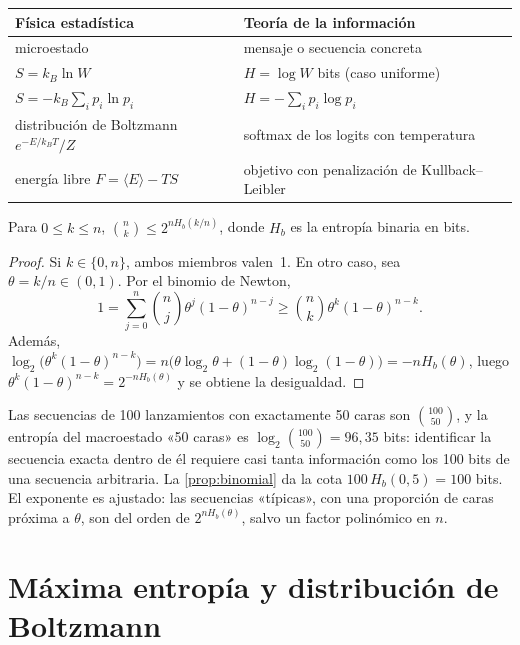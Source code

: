 \begin{center}
\begin{tabular}{@{}ll@{}}
\toprule
Física estadística & Teoría de la información \\
\midrule
microestado & mensaje o secuencia concreta \\
$S=k_B\ln W$ & $H=\log W$ bits (caso uniforme) \\
$S=-k_B\sum_ip_i\ln p_i$ & $H=-\sum_ip_i\log p_i$ \\
distribución de Boltzmann $e^{-E/k_BT}/Z$ & softmax de los logits con temperatura \\
energía libre $F=\langle E\rangle-TS$ & objetivo con penalización de Kullback--Leibler \\
\bottomrule
\end{tabular}
\end{center}

\begin{proposicion}\label{prop:binomial}
Para $0\le k\le n$, $\binom{n}{k}\le 2^{nH_b(k/n)}$, donde $H_b$ es la entropía binaria en bits.
\end{proposicion}

\begin{proof}
Si $k\in\{0,n\}$, ambos miembros valen~1. En otro caso, sea $\theta=k/n\in(0,1)$. Por el binomio de Newton,
\[
1=\sum_{j=0}^{n}\binom{n}{j}\theta^{j}(1-\theta)^{n-j}\ge\binom{n}{k}\theta^{k}(1-\theta)^{n-k}.
\]
Además, $\log_2\bigl(\theta^{k}(1-\theta)^{n-k}\bigr)=n\bigl(\theta\log_2\theta+(1-\theta)\log_2(1-\theta)\bigr)=-nH_b(\theta)$, luego $\theta^{k}(1-\theta)^{n-k}=2^{-nH_b(\theta)}$ y se obtiene la desigualdad.
\end{proof}

\begin{ejemplo}\label{ej:monedas}
Las secuencias de 100 lanzamientos con exactamente 50 caras son $\binom{100}{50}$, y la entropía del macroestado «50 caras» es $\log_2\binom{100}{50}=96{,}35$ bits: identificar la secuencia exacta dentro de él requiere casi tanta información como los 100 bits de una secuencia arbitraria. La \cref{prop:binomial} da la cota $100\,H_b(0{,}5)=100$ bits. El exponente es ajustado: las secuencias «típicas», con una proporción de caras próxima a $\theta$, son del orden de $2^{nH_b(\theta)}$, salvo un factor polinómico en $n$.
\end{ejemplo}

\section{Máxima entropía y distribución de Boltzmann}

